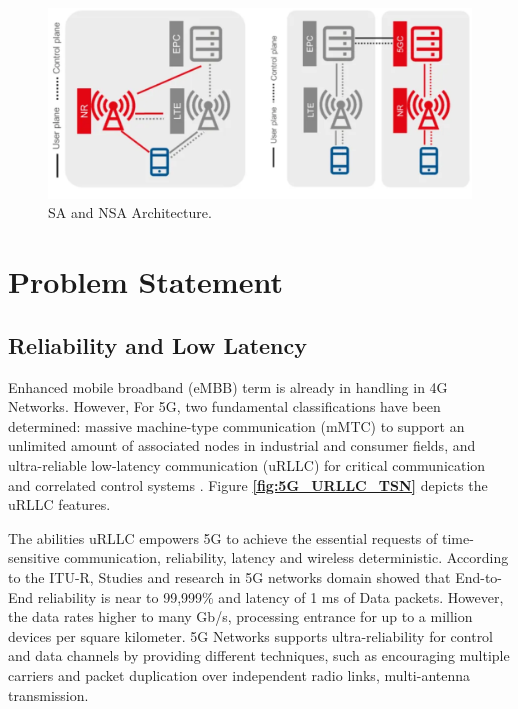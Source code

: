 \begin{figure}

\centering
\includegraphics[scale=0.50]{images/SA_and_NSA_Architecture.png}
\caption{SA and NSA  Architecture\cite{Gsma_5G_implguid_study}.}
\label{fig:SA_and_NSA_Architecture}
\end{figure}




 
\section{\textbf{Problem Statement}}\label{Problems} 

\subsection{Reliability and Low Latency}\label{Reliable and Low Latency}

Enhanced mobile broadband (eMBB) term is already in handling in 4G Networks. However,  For 5G, two fundamental classifications have been determined: massive machine-type communication (mMTC) to support an unlimited amount of associated nodes in industrial and consumer fields, and ultra-reliable low-latency communication (uRLLC) for critical communication and correlated control systems \cite{Ginthor2019}.
Figure \textbf{\ref{fig:5G_URLLC_TSN}} depicts the uRLLC features\cite{Ericsson2019}.


The abilities uRLLC empowers 5G to achieve the essential requests of time-sensitive communication, reliability, latency and wireless deterministic. According to the ITU-R\cite{series2017minimum}, Studies and research in 5G networks domain showed that End-to-End reliability is near to 99,999\% and latency of 1 ms of Data packets. However, the data rates higher to many Gb/s, processing entrance for up to a million devices per square kilometer.
5G Networks supports ultra-reliability for control and data channels by providing different techniques, such as encouraging multiple carriers and packet duplication over independent radio links, multi-antenna transmission.

